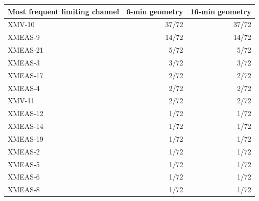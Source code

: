 \begin{tabular}{@{}lrr@{}}
\toprule
Most frequent limiting channel & 6-min geometry & 16-min geometry \\
\midrule
XMV-10 & 37/72 & 37/72 \\
XMEAS-9 & 14/72 & 14/72 \\
XMEAS-21 & 5/72 & 5/72 \\
XMEAS-3 & 3/72 & 3/72 \\
XMEAS-17 & 2/72 & 2/72 \\
XMEAS-4 & 2/72 & 2/72 \\
XMV-11 & 2/72 & 2/72 \\
XMEAS-12 & 1/72 & 1/72 \\
XMEAS-14 & 1/72 & 1/72 \\
XMEAS-19 & 1/72 & 1/72 \\
XMEAS-2 & 1/72 & 1/72 \\
XMEAS-5 & 1/72 & 1/72 \\
XMEAS-6 & 1/72 & 1/72 \\
XMEAS-8 & 1/72 & 1/72 \\
\bottomrule
\end{tabular}
